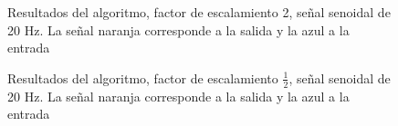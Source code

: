 \documentclass[../ASSD_TP2.tex]{subfiles}
\begin{document}
\begin{figure}[H]
 \centering

 \caption{Resultados del algoritmo, factor de escalamiento 2, se\~nal senoidal de 20 Hz. La se\~nal naranja corresponde a la salida y la azul a la entrada}
\end{figure}

\begin{figure}[H]
 \centering

 \caption{Resultados del algoritmo, factor de escalamiento $\frac{1}{2}$, se\~nal senoidal de 20 Hz. La se\~nal naranja corresponde a la salida y la azul a la entrada}
\end{figure}
\end{document}
